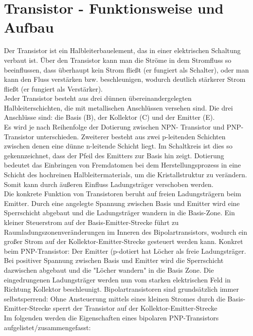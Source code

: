 \section{Transistor - Funktionsweise und Aufbau}
Der Transistor ist ein Halbleiterbauelement, das in einer elektrischen Schaltung verbaut ist.
Über den Transistor kann man die Ströme in dem Stromfluss so beeinflussen, dass überhaupt
kein Strom fließt (er fungiert als Schalter), oder man kann den Fluss verstärken bzw.
beschleunigen, wodurch deutlich stärkerer Strom fließt (er fungiert als Verstärker).\\
Jeder Transistor besteht aus drei dünnen übereinandergelegten Halbleiterschichten, die mit
metallischen Anschlüssen versehen sind. Die drei Anschlüsse sind: die Basis (B), der Kollektor
(C) und der Emitter (E).\\
Es wird je nach Reihenfolge der Dotierung zwischen NPN- Transistor und PNP-Transistor
unterschieden. Zweiterer besteht aus zwei p-leitenden Schichten zwischen denen eine dünne
n-leitende Schicht liegt. Im Schaltkreis ist dies so gekennzeichnet, dass der Pfeil des Emitters
zur Basis hin zeigt. 
Dotierung bedeutet das Einbringen von Fremdatomen bei dem Herstellungsprozess in eine Schicht des hochreinen Halbleitermaterials, um die Kristallstruktur zu verändern. Somit kann durch äußeren Einfluss Ladungsträger verschoben werden.\\
Die konkrete Funktion von Transistoren beruht auf freien Ladungsträgern beim Emitter. Durch
eine angelegte Spannung zwischen Basis und Emitter wird eine Sperrschicht abgebaut und die
Ladungsträger wandern in die Basis-Zone. Ein kleiner Steuerstrom auf der
Basis-Emitter-Strecke führt zu Raumladungszonenveränderungen im Inneren des
Bipolartransistors, wodurch ein großer Strom auf der Kollektor-Emitter-Strecke gesteuert
werden kann. Konkret beim PNP-Transistor: Der Emitter (p-dotiert hat L\"ocher als freie Ladungstr\"ager. Bei positiver Spannung zwischen Basis und Emitter wird die Sperrschicht dazwischen abgebaut und die "L\"ocher wandern" in die Basis Zone. Die eingedrungenen Ladungstr\"ager werden nun vom starken elektrischen Feld in Richtung Kollektor beschleunigt.
Bipolartransistoren sind grundsätzlich immer selbstsperrend: Ohne Ansteuerung mittels eines
kleinen Stromes durch die Basis-Emitter-Strecke sperrt der Transistor auf der
Kollektor-Emitter-Strecke\\
Im folgenden werden die Eigenschaften eines bipolaren PNP-Transistors
aufgelistet/zusammengefasst:
